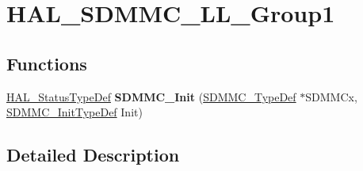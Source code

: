 \hypertarget{group___h_a_l___s_d_m_m_c___l_l___group1}{}\section{H\+A\+L\+\_\+\+S\+D\+M\+M\+C\+\_\+\+L\+L\+\_\+\+Group1}
\label{group___h_a_l___s_d_m_m_c___l_l___group1}
\subsection*{Functions}
\begin{DoxyCompactItemize}
\item 
\mbox{\label{group___h_a_l___s_d_m_m_c___l_l___group1_ga775e4ab977bffe82d6ac59c4aa7a6e05}} 
\mbox{\hyperlink{stm32f7xx__hal__def_8h_a63c0679d1cb8b8c684fbb0632743478f}{H\+A\+L\+\_\+\+Status\+Type\+Def}} {\bfseries S\+D\+M\+M\+C\+\_\+\+Init} (\mbox{\hyperlink{struct_s_d_m_m_c___type_def}{S\+D\+M\+M\+C\+\_\+\+Type\+Def}} $\ast$S\+D\+M\+M\+Cx, \mbox{\hyperlink{struct_s_d_m_m_c___init_type_def}{S\+D\+M\+M\+C\+\_\+\+Init\+Type\+Def}} Init)
\end{DoxyCompactItemize}


\subsection{Detailed Description}
